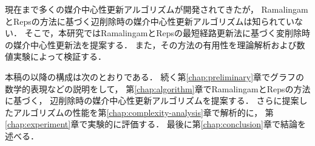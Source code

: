 現在まで多くの媒介中心性更新アルゴリズムが開発されてきたが，
RamalingamとRepsの方法に基づく辺削除時の媒介中心性更新アルゴリズムは知られていない．
そこで，本研究ではRamalingamとRepsの最短経路更新法に基づく変削除時の媒介中心性更新法を提案する．
また，その方法の有用性を理論解析および数値実験によって検証する．

本稿の以降の構成は次のとおりである．
続く第\ref{chap:preliminary}章でグラフの数学的表現などの説明をして，
第\ref{chap:algorithm}章でRamalingamとRepsの方法に基づく，
辺削除時の媒介中心性更新アルゴリズムを提案する．
さらに提案したアルゴリズムの性能を第\ref{chap:complexity-analysis}章で解析的に，
第\ref{chap:experiment}章で実験的に評価する．
最後に第\ref{chap:conclusion}章で結論を述べる．
